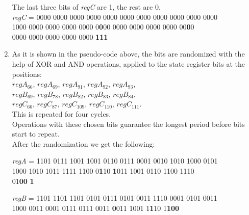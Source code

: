 \begin{enumerate}
		The last three bits of \emph{regC} are 1, the rest are 0.
		\vspace{0.5em}
		\\
		{\selectfont
			\emph{regC} = 0000 0000 0000 0000 0000 0000 0000 0000 0000 0000 0000 \\ 
			\indent\hspace{1.6cm}1000 0000 0000 0000 0000 0\textbf{0}00 0000 0000 0000 0000 00\textbf{0}0 \\ 
			\indent\hspace{1.6cm}0000 0000 0000 0000 0000 \textbf{111}
		}
		\item As it is shown in the pseudo-code above, the bits are randomized with the help of XOR and AND operations, applied to the state register bits at the positions: 
		\vspace{0.5em}
		\\
		$regA_{66}$, $regA_{69}$, $regA_{91}$, $regA_{92}$, $regA_{93}$, \\
		$regB_{69}$, $regB_{78}$, $regB_{82}$, $regB_{83}$, $regB_{84}$, \\
		$regC_{66}$, $regC_{87}$, $regC_{109}$, $regC_{110}$, $regC_{111}$.
		\vspace{0.5em}
		\\
		This is repeated for four cycles.\\
		Operations with these chosen bits guarantee the longest period before bits start to repeat.\\
		After the randomization we get the following:
		
		{\selectfont
			
			\emph{regA} = 1101 0111 1001 1001 0110 0111 0001 0010 1010 1000 0101 \\ 
			\indent\hspace{1.6cm}1000 1010 1011 1111 1100 0\textbf{1}10 \textbf{1}011 1001 0110 1100 1110 \\ 
			\indent\hspace{1.6cm}01\textbf{00} \textbf{1}
			
			\emph{regB} = 1101 1101 1101 0101 0111 0101 0011 1110 0001 0101 0011 \\ 
			\indent\hspace{1.6cm}1000 0011 0001 0111 0111 0011 \textbf{0}011 1001 1\textbf{1}10 1\textbf{100}
			
}
\end{enumerate}
